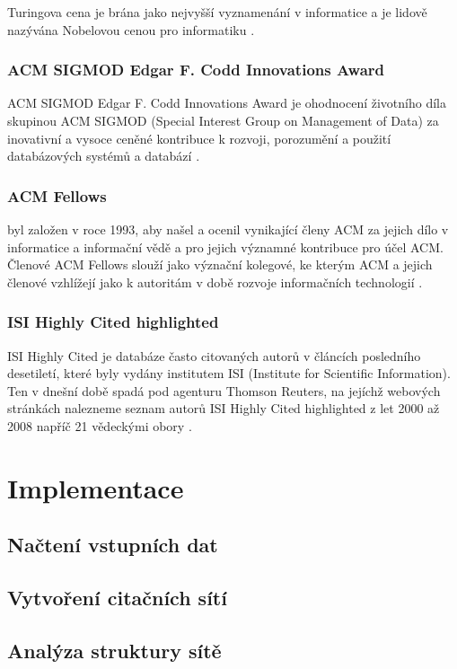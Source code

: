 \documentclass[12pt,titlepage]{report}
\begin{document}
Turingova cena je brána jako nejvyšší vyznamenání v informatice a je lidově
nazývána Nobelovou cenou pro informatiku \cite[p.~317]{dasgupta}.

\subsection{ACM SIGMOD Edgar F. Codd Innovations Award}
ACM SIGMOD Edgar F. Codd Innovations Award je ohodnocení životního díla
skupinou ACM SIGMOD (Special Interest Group on Management of Data)  za
inovativní a vysoce ceněné kontribuce k rozvoji, porozumění a použití
databázových systémů a databází \cite{sigmodinnovations}.

\subsection{ACM Fellows}
 byl založen v roce 1993, aby našel a ocenil
vynikající členy ACM za jejich dílo v informatice a informační vědě a pro
jejich významné kontribuce pro účel ACM. Členové ACM Fellows slouží jako
význační kolegové, ke kterým ACM a jejich členové vzhlížejí jako k autoritám v
době rozvoje informačních technologií \cite{acmfellows}.

\subsection{ISI Highly Cited highlighted}
ISI Highly Cited je databáze často citovaných autorů v článcích posledního
desetiletí, které byly vydány institutem ISI (Institute for Scientific
Information). Ten v dnešní době spadá pod agenturu Thomson Reuters, na jejíchž webových stránkách nalezneme seznam autorů ISI Highly Cited highlighted z let 2000 až 2008 napříč 21 vědeckými obory \cite{highlycited}.

\chapter{Implementace}
\section{Načtení vstupních dat}

\section{Vytvoření citačních sítí}

\section{Analýza struktury sítě}
\end{document}
